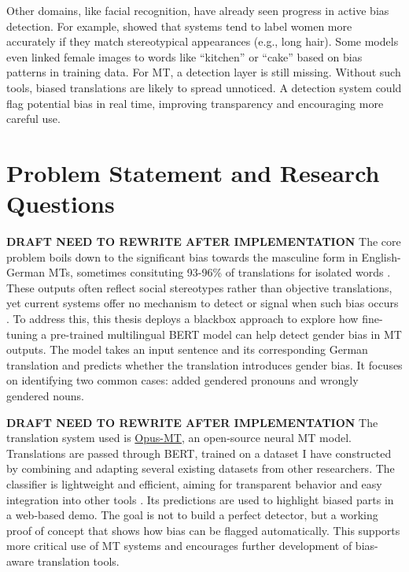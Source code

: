 Other domains, like facial recognition, have already seen progress in active bias detection. For example, \citet{schwemmerDiagnosingGenderBias2020} showed that systems tend to label women more accurately if they match stereotypical appearances (e.g., long hair). Some models even linked female images to words like “kitchen” or “cake” based on bias patterns in training data. For MT, a detection layer is still missing. Without such tools, biased translations are likely to spread unnoticed. A detection system could flag potential bias in real time, improving transparency and encouraging more careful use.

\section{Problem Statement and Research Questions}
\textbf{DRAFT NEED TO REWRITE AFTER IMPLEMENTATION}
The core problem boils down to the significant bias towards the masculine form in English-German MTs, sometimes consituting 93-96\% of translations for isolated words \citep{lardelliBuildingBridgesDataset2024}. These outputs often reflect social stereotypes rather than objective translations, yet current systems offer no mechanism to detect or signal when such bias occurs \citep{rescignoGenderBiasMachine2023}. To address this, this thesis deploys a blackbox approach to explore how fine-tuning a pre-trained multilingual BERT model can help detect gender bias in MT outputs. The model takes an input sentence and its corresponding German translation and predicts whether the translation introduces gender bias. It focuses on identifying two common cases: added gendered pronouns and wrongly gendered nouns.

\textbf{DRAFT NEED TO REWRITE AFTER IMPLEMENTATION}
The translation system used is \href{https://github.com/Helsinki-NLP/Opus-MT?tab=readme-ov-file}{Opus-MT}, an open-source neural MT model. %
Translations are passed through BERT, trained on a dataset I have constructed by combining and adapting several existing datasets from other researchers. The classifier is lightweight and efficient, aiming for transparent behavior and easy integration into other tools \citep{devlinBERTPretrainingDeep2019}. Its predictions are used to highlight biased parts in a web-based demo. The goal is not to build a perfect detector, but a working proof of concept that shows how bias can be flagged automatically. This supports more critical use of MT systems and encourages further development of bias-aware translation tools.

